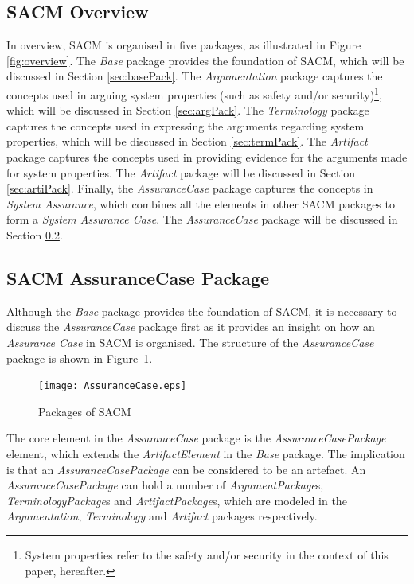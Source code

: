 \subsection{SACM Overview}
In overview, SACM is organised in five packages, as illustrated in Figure \ref{fig:overview}. The \textit{Base} package provides the foundation of SACM, which will be discussed in Section \ref{sec:basePack}. The \textit{Argumentation} package captures the concepts used in arguing system properties (such as safety and/or security)\footnote{System properties refer to the safety and/or security in the context of this paper, hereafter.}, which will be discussed in Section \ref{sec:argPack}. The \textit{Terminology} package captures the concepts used in expressing the arguments regarding system properties, which will be discussed in Section \ref{sec:termPack}. The \textit{Artifact} package captures the concepts used in providing evidence for the arguments made for system properties. The \textit{Artifact} package will be discussed in Section \ref{sec:artiPack}. Finally, the \textit{AssuranceCase} package captures the concepts in \textit{System Assurance}, which combines all the elements in other SACM packages to form a \textit{System Assurance Case}. The \textit{AssuranceCase} package will be discussed in Section \ref{sec:acPack}.

\subsection{SACM AssuranceCase Package}
\label{sec:acPack}
Although the \textit{Base} package provides the foundation of SACM, it is necessary to discuss the \textit{AssuranceCase} package first as it provides an insight on how an \textit{Assurance Case} in SACM is organised. The structure of the \textit{AssuranceCase} package is shown in Figure~\ref{fig:ac}.

\begin{figure}
	\centering
	\texttt{[image: AssuranceCase.eps]}
	\caption{Packages of SACM}
	\label{fig:ac}
\end{figure}

The core element in the \textit{AssuranceCase} package is the \textit{AssuranceCasePackage} element, which extends the \textit{ArtifactElement} in the \textit{Base} package. The implication is that an \textit{AssuranceCasePackage} can be considered to be an artefact. An \textit{AssuranceCasePackage} can hold a number of \textit{ArgumentPackage}s, \textit{TerminologyPackage}s and \textit{ArtifactPackage}s, which are modeled in the \textit{Argumentation}, \textit{Terminology} and \textit{Artifact} packages respectively.

